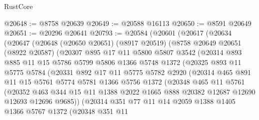 \begin{lexlean}{RustCore}
\begin{coremodule}
@20648 := @8758 @20639
@20649 := @20588 @16113
@20650 := @8591 @20649
@20651 := @20296 @20641
@20793 := @20584
    (@20601
      (@20617
        (@20634
          (@20647
            (@20648
              (@20650 @20651)
              (@8917 @20519)
              (@8758
                @20649
                @20651
                (@8922 @20587)
                (@20307
                  @895
                  @17
                  @11
                  @5800
                  @5807
                  @3542
                  (@20314
                    @893
                    @885
                    @11
                    @15
                    @5786
                    @5799
                    @5806
                    @1366
                    @5748
                    @1372
                    (@20325
                      @893
                      @11
                      @5775
                      @5784
                      (@20331
                        @892
                        @17
                        @11
                        @5775
                        @5782
                        @2920
                        (@20314
                          @465
                          @891
                          @11
                          @15
                          @5761
                          @5774
                          @5781
                          @1366
                          @5756
                          @1372
                          (@20348
                            @465
                            @11
                            @5761
                            (@20352
                              @463
                              @344
                              @15
                              @11
                              @1388
                              @2022
                              @1665
                              @888
                              @20382
                              @12687
                              @12690
                              @12693
                              @12696
                              @9685))
                          (@20314
                            @351
                            @77
                            @11
                            @14
                            @2059
                            @1388
                            @1405
                            @1366
                            @5767
                            @1372
                            (@20348
                              @351
                              @11

\end{coremodule}
\end{lexlean}
